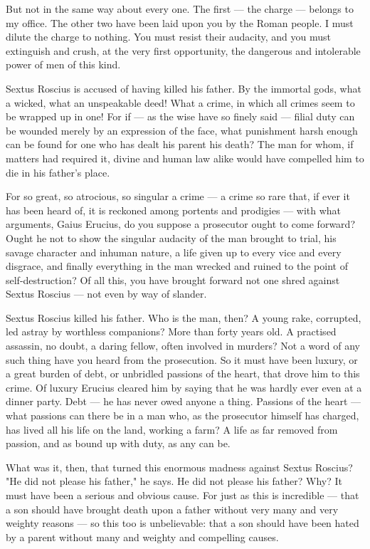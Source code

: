  But not in the same way about every one. The first --- the charge --- belongs to my office. The other two have been laid upon you by the Roman people. I must dilute the charge to nothing. You must resist their audacity, and you must extinguish and crush, at the very first opportunity, the dangerous and intolerable power of men of this kind.

 Sextus Roscius is accused of having killed his father. By the immortal gods, what a wicked, what an unspeakable deed! What a crime, in which all crimes seem to be wrapped up in one! For if --- as the wise have so finely said --- filial duty can be wounded merely by an expression of the face, what punishment harsh enough can be found for one who has dealt his parent his death? The man for whom, if matters had required it, divine and human law alike would have compelled him to die in his father's place.

 For so great, so atrocious, so singular a crime --- a crime so rare that, if ever it has been heard of, it is reckoned among portents and prodigies --- with what arguments, Gaius Erucius, do you suppose a prosecutor ought to come forward? Ought he not to show the singular audacity of the man brought to trial, his savage character and inhuman nature, a life given up to every vice and every disgrace, and finally everything in the man wrecked and ruined to the point of self-destruction? Of all this, you have brought forward not one shred against Sextus Roscius --- not even by way of slander.

 Sextus Roscius killed his father. Who is the man, then? A young rake, corrupted, led astray by worthless companions? More than forty years old. A practised assassin, no doubt, a daring fellow, often involved in murders? Not a word of any such thing have you heard from the prosecution. So it must have been luxury, or a great burden of debt, or unbridled passions of the heart, that drove him to this crime. Of luxury Erucius cleared him by saying that he was hardly ever even at a dinner party. Debt --- he has never owed anyone a thing. Passions of the heart --- what passions can there be in a man who, as the prosecutor himself has charged, has lived all his life on the land, working a farm? A life as far removed from passion, and as bound up with duty, as any can be.

 What was it, then, that turned this enormous madness against Sextus Roscius? "He did not please his father," he says. He did not please his father? Why? It must have been a serious and obvious cause. For just as this is incredible --- that a son should have brought death upon a father without very many and very weighty reasons --- so this too is unbelievable: that a son should have been hated by a parent without many and weighty and compelling causes.

